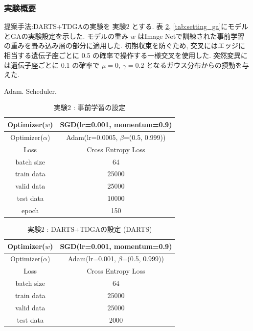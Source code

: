 \changeindent{0cm}
\subsubsection{実験概要}
\label{sec:pred.02_03}
\changeindent{2cm}

提案手法:DARTS+TDGAの実験を 実験2 とする.
表 \ref{tab:setting_darts}, \ref{tab:setting_ga}にモデルとGAの実験設定を示した.
モデルの重み $w$ はImage Netで訓練された事前学習の重みを畳み込み層の部分に適用した.
初期収束を防ぐため, 交叉にはエッジに相当する遺伝子座ごとに 0.5 の確率で操作する一様交叉を使用した.
突然変異には遺伝子座ごとに 0.1 の確率で $\mu=0$, $\gamma=0.2$ となるガウス分布からの摂動を与えた.

Adam\cite{Kingma2015AdamAM}. Scheduler\cite{Loshchilov2017SGDRSG}.


\begin{table}[tb]
  \begin{center}
    \caption{実験2 : 事前学習の設定}
  	\vspace{3mm}
    \begin{tabular}{|c|c|} \hline
      Optimizer($w$) & SGD(lr=0.001, momentum=0.9) \\ \hline
      Optimizer($\alpha$) & Adam(lr=0.0005, $\beta$=(0.5, 0.999)) \\ \hline
      Loss & Cross Entropy Loss \\ \hline
      batch size & 64 \\ \hline
      train data & 25000\\ \hline
      valid data & 25000\\ \hline
      test data &  10000\\ \hline
      epoch & 150\\ \hline
    \end{tabular}
    \label{tab:setting_pretrain}
  \end{center}
\end{table}

\begin{table}[t]
  \begin{center}
    \caption{実験2 : DARTS+TDGAの設定 (DARTS)}
  	\vspace{3mm}
    \begin{tabular}{|c|c|} \hline
      Optimizer($w$) & SGD(lr=0.001, momentum=0.9) \\ \hline
      Optimizer($\alpha$) & Adam(lr=0.001, $\beta$=(0.5, 0.999)) \\ \hline
      Loss & Cross Entropy Loss \\ \hline
      batch size & 64 \\ \hline
      train data & 25000\\ \hline
      valid data & 25000\\ \hline
      test data &  2000\\ \hline
    \end{tabular}
    \label{tab:setting_darts}
  \end{center}
\end{table}

